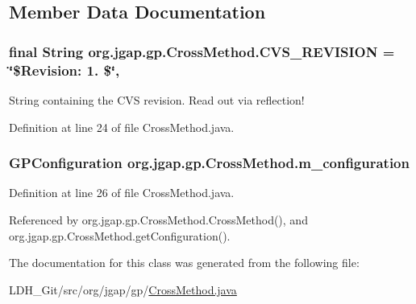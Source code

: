 \subsection{Member Data Documentation}
\hypertarget{classorg_1_1jgap_1_1gp_1_1_cross_method_ab37830a9db64b4647b88a0a271d38e80}{
\subsubsection[{C\-V\-S\-\_\-\-R\-E\-V\-I\-S\-I\-O\-N}]{\setlength{\rightskip}{0pt plus 5cm}final String org.\-jgap.\-gp.\-Cross\-Method.\-C\-V\-S\-\_\-\-R\-E\-V\-I\-S\-I\-O\-N = \char`\"{}\$Revision\-: 1. \$\char`\"{}\hspace{0.3cm}{\ttfamily [static]}, {\ttfamily [private]}}}\label{classorg_1_1jgap_1_1gp_1_1_cross_method_ab37830a9db64b4647b88a0a271d38e80}
String containing the C\-V\-S revision. Read out via reflection! 

Definition at line 24 of file Cross\-Method.\-java.

\hypertarget{classorg_1_1jgap_1_1gp_1_1_cross_method_a9e993405356cb6e3a8c5b02ae418273f}{
\subsubsection[{m\-\_\-configuration}]{\setlength{\rightskip}{0pt plus 5cm}G\-P\-Configuration org.\-jgap.\-gp.\-Cross\-Method.\-m\-\_\-configuration\hspace{0.3cm}{\ttfamily [private]}}}\label{classorg_1_1jgap_1_1gp_1_1_cross_method_a9e993405356cb6e3a8c5b02ae418273f}


Definition at line 26 of file Cross\-Method.\-java.



Referenced by org.\-jgap.\-gp.\-Cross\-Method.\-Cross\-Method(), and org.\-jgap.\-gp.\-Cross\-Method.\-get\-Configuration().



The documentation for this class was generated from the following file\-:\begin{DoxyCompactItemize}
\item 
L\-D\-H\-\_\-\-Git/src/org/jgap/gp/\hyperlink{_cross_method_8java}{Cross\-Method.\-java}\end{DoxyCompactItemize}
